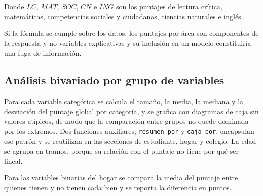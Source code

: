         \vspace{10pt}

        Donde $LC$, $MAT$, $SOC$, $CN$ e $ING$ son los puntajes de lectura
        crítica, matemáticas, competencias sociales y ciudadanas, ciencias 
        naturales e inglés.

        \vspace{10pt}

        

        \vspace{10pt}

        Si la fórmula se cumple sobre los datos, los puntajes por área son 
        componentes de la respuesta y no variables explicativas y su inclusión 
        en un modelo constituiría una fuga de información.

        \vspace{10pt}

        

    \subsection{Análisis bivariado por grupo de variables}
        Para cada variable categórica se calcula el tamaño, la media, la mediana y
        la desviación del puntaje global por categoría, y se grafica con diagramas
        de caja sin valores atípicos, de modo que la comparación entre grupos no
        quede dominada por los extremos. Dos funciones auxiliares,
        \texttt{resumen\_por} y \texttt{caja\_por}, encapsulan ese patrón y se
        reutilizan en las secciones de estudiante, hogar y colegio. La edad se
        agrupa en tramos, porque su relación con el puntaje no tiene por qué ser
        lineal.

        \vspace{10pt}

        

        \vspace{10pt}

        

        \vspace{10pt}

        Para las variables binarias del hogar se compara la media del puntaje
        entre quienes tienen y no tienen cada bien y se reporta la diferencia en
        puntos.

